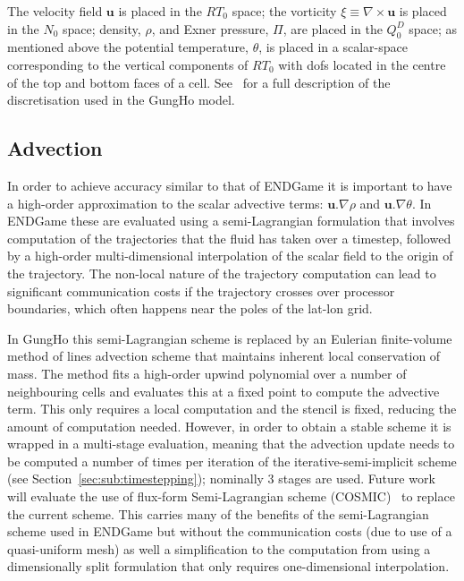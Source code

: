 \documentclass[review,times]{elsarticle}
\begin{document}
The velocity field $\mathbf{u}$ is placed in the $RT_0$ space; the vorticity 
$\xi\equiv\nabla\times\mathbf{u}$ is placed in the $N_0$ space; density, $\rho$, 
and Exner pressure, $\Pi$, are placed in the $Q_0^D$ space; as mentioned above 
the potential temperature, $\theta$, is placed in a scalar-space corresponding 
to the vertical components of $RT_0$ with dofs located in the
centre of the top and bottom faces of a cell. See~\cite{melvin2018} for a full
description of the discretisation used in the GungHo model.

\subsection{Advection\label{sec:sub:advection}}

In order to achieve accuracy similar to that of ENDGame it is important to have 
a high-order approximation to the scalar advective terms: $\mathbf{u}.\nabla\rho$ 
and $\mathbf{u}.\nabla\theta$. In ENDGame these are evaluated using a 
semi-Lagrangian formulation that involves computation of the trajectories that 
the fluid has taken over a timestep, followed by a high-order multi-dimensional 
interpolation of the scalar field to the origin of the trajectory. 
The non-local nature of the trajectory computation can 
lead to significant communication costs if the trajectory crosses over processor 
boundaries, which often happens near the poles of the lat-lon grid.

In GungHo this semi-Lagrangian scheme is replaced by an Eulerian finite-volume 
method of lines advection scheme that maintains inherent local conservation of mass.
The method fits a high-order upwind polynomial over a number of
neighbouring cells and evaluates this at a fixed point to compute the advective 
term. This only requires a local computation and the stencil is fixed, reducing the 
amount of computation needed. However, in order to obtain a stable scheme it is 
wrapped in a multi-stage evaluation, meaning that the advection update needs to be 
computed a number of times per iteration of the iterative-semi-implicit scheme
(see Section~\ref{sec:sub:timestepping}); nominally 3 stages are used. 
Future work will evaluate the use of flux-form Semi-Lagrangian scheme (COSMIC)~\cite{Leonard1996} 
to replace the current scheme. This carries many of the 
benefits of the semi-Lagrangian scheme used in ENDGame but without the 
communication costs (due to use of a quasi-uniform mesh) as well a simplification 
to the computation from using a dimensionally split formulation that only requires 
one-dimensional interpolation.
\end{document}
